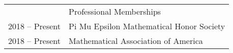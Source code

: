 \documentclass[letterpaper, 11pt]{article}
\newcommand{\headingfont}{\Large\color{Red}}
\newenvironment{SectionTable}[1]{
	\renewcommand*{\arraystretch}{1.7}
	\setlength{\tabcolsep}{10pt}
	\begin{longtable}{Rp{5.2in}} & #1 \\}
	{\end{longtable}\vspace{-.3cm}}
\begin{document}
	\begin{SectionTable}{\headingfont Professional Memberships}
		2018 -- Present & 
		Pi Mu Epsilon Mathematical Honor Society \\
		
		2018 -- Present &
		Mathematical Association of America \\
	\end{SectionTable}
	

	
	
	
	
\end{document}
